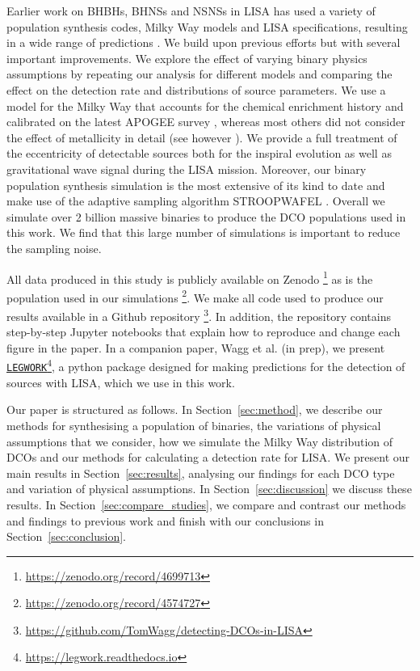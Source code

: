 Earlier work on BHBHs, BHNSs and NSNSs in LISA has used a variety of population synthesis codes, Milky Way models and LISA specifications, resulting in a wide range of predictions \citep{Nelemans+2001,Liu+2009,Belczynski+2010,Liu+2014,Lamberts+2019,Lau+2020,Breivik+2020,Sesana+2020}. We build upon previous efforts but with several important improvements. We explore the effect of varying binary physics assumptions by repeating our analysis for \nModels{} different models and comparing the effect on the detection rate and distributions of source parameters. We use a model for the Milky Way that accounts for the chemical enrichment history and calibrated on the latest APOGEE survey \citep{Majewski+2017,Frankel+2018}, whereas most others did not consider the effect of metallicity in detail (see however \citealp{Lamberts+2019, Sesana+2020}). We provide a full treatment of the eccentricity of detectable sources both for the inspiral evolution as well as gravitational wave signal during the LISA mission. Moreover, our binary population synthesis simulation is the most extensive of its kind to date and make use of the adaptive sampling algorithm STROOPWAFEL \citep{Broekgaarden+2019, Broekgaarden+2021}. Overall we simulate over 2 billion massive binaries to produce the DCO populations used in this work. We find that this large number of simulations is important to reduce the sampling noise.

All data produced in this study is publicly available on Zenodo \href{https://zenodo.org/record/4699713}{\faFileCode}\footnote{\url{https://zenodo.org/record/4699713}} as is the population used in our simulations \href{https://zenodo.org/record/4574727}{\faFileCode}\footnote{\url{https://zenodo.org/record/4574727}}. We make all code used to produce our results available in a Github repository \href{https://github.com/TomWagg/detecting-DCOs-in-LISA}{\faGithub}\footnote{\url{https://github.com/TomWagg/detecting-DCOs-in-LISA}}. In addition, the repository contains step-by-step Jupyter notebooks that explain how to reproduce and change each figure in the paper. In a companion paper, Wagg et al. (in prep), we present \href{https://legwork.readthedocs.io}{\texttt{LEGWORK}}\footnote{\url{https://legwork.readthedocs.io}}, a python package designed for making predictions for the detection of sources with LISA, which we use in this work.

Our paper is structured as follows. In Section~\ref{sec:method}, we describe our methods for synthesising a population of binaries, the variations of physical assumptions that we consider, how we simulate the Milky Way distribution of DCOs and our methods for calculating a detection rate for LISA. We present our main results in Section~\ref{sec:results}, analysing our findings for each DCO type and variation of physical assumptions. In Section~\ref{sec:discussion} we discuss these results. In Section~\ref{sec:compare_studies}, we compare and contrast our methods and findings to previous work and finish with our conclusions in Section~\ref{sec:conclusion}.